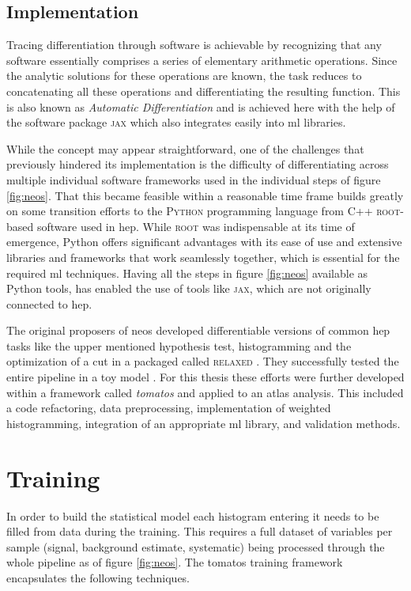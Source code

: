 \subsection{Implementation}
Tracing differentiation through software is achievable by recognizing that any software essentially comprises a series of elementary arithmetic operations. Since the analytic solutions for these operations are known, the task reduces to concatenating all these operations and differentiating the resulting function. This is also known as \textit{Automatic Differentiation} and is achieved here with the help of the software package \textsc{jax} \citep{jax2018github} which also  integrates easily into \ac{ml} libraries.

While the concept may appear straightforward, one of the challenges that previously hindered its implementation is the difficulty of differentiating across multiple individual software frameworks used in the individual steps of figure \ref{fig:neos}. That this became feasible within a reasonable time frame builds greatly on some transition efforts to the \textsc{Python} programming language from C++ \textsc{root}-based software \citep{ANTCHEVA20092499} used in \ac{hep}. While \textsc{root} was indispensable at its time of emergence, Python offers significant advantages with its ease of use and extensive libraries and frameworks that work seamlessly together, which is essential for the required \ac{ml} techniques. Having all the steps in figure \ref{fig:neos} available as Python tools, has enabled the use of tools like \textsc{jax}, which are not originally connected to \ac{hep}.

The original proposers \citet{Simpson_2023} of \ac{neos} developed differentiable versions of common \ac{hep} tasks like the upper mentioned hypothesis test, histogramming and the optimization of a cut in a packaged called \textsc{relaxed} \citep{Simpson_relaxed_version_0_3_0_2023}. They successfully tested the entire pipeline in a toy model \citep{Simpson_neos_version_0_2_0_2021}. For this thesis these efforts were further developed within a framework called \textit{\acf{tomatos}} \citep{tomatos} and applied to an \ac{atlas} analysis. This included a code refactoring, data preprocessing, implementation of weighted histogramming, integration of an appropriate \ac{ml} library, and validation methods.


\section{Training}\label{sec:neos_training}
In order to build the statistical model each histogram entering it needs to be filled from data during the training. This requires a full dataset of variables per sample (signal, background estimate, systematic) being processed through the whole pipeline as of figure \ref{fig:neos}. The \ac{tomatos} \citep{tomatos} training framework encapsulates the following techniques.


